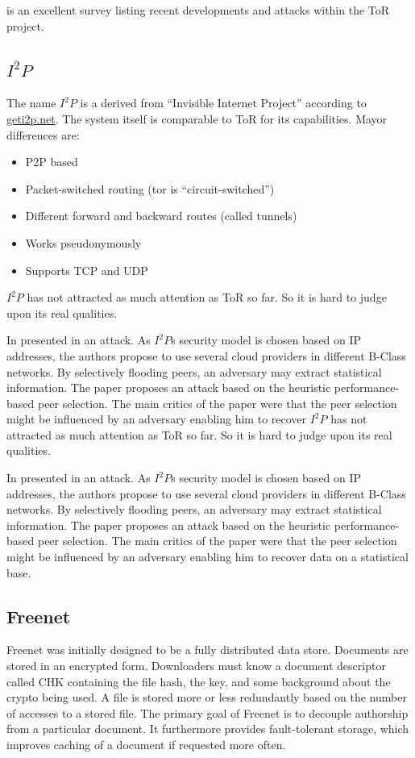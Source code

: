 \cite{saleh2018shedding} is an excellent survey listing recent developments and attacks within the ToR project.

\subsection{\texorpdfstring{$I^2P$}{I2P}}
The name $I^2P$ is a derived from  ``Invisible Internet Project'' according to \href{https://geti2p.net/}{geti2p.net}. The system itself is comparable to ToR for its capabilities. Mayor differences are:
\begin{itemize}
	\item P2P based
	\item Packet-switched routing (tor is ``circuit-switched'')
	\item Different forward and backward routes (called tunnels)
	\item Works pseudonymously
	\item Supports TCP and UDP
\end{itemize}

$I^2P$ has not attracted as much attention as ToR so far. So it is hard to judge upon its real qualities.

In \citeyear{pets2011-i2p} \citeauthor{pets2011-i2p} presented in \cite{pets2011-i2p} an attack. As $I^2P$s security model is chosen based on IP addresses, the authors propose to use several cloud providers in different B-Class networks. By selectively flooding peers, an adversary may extract statistical information. The paper proposes an attack based on the heuristic performance-based peer selection. The main critics of the paper were that the peer selection might be influenced by an adversary enabling him to recover $I^2P$ has not attracted as much attention as ToR so far. So it is hard to judge upon its real qualities.

In \citeyear{pets2011-i2p} \citeauthor{pets2011-i2p} presented in \cite{pets2011-i2p} an attack. As $I^2P$s security model is chosen based on IP addresses, the authors propose to use several cloud providers in different B-Class networks. By selectively flooding peers, an adversary may extract statistical information. The paper proposes an attack based on the heuristic performance-based peer selection. The main critics of the paper were that the peer selection might be influenced by an adversary enabling him to recover data on a statistical base.


\subsection{Freenet}
Freenet was initially designed to be a fully distributed data store\cite{freenet}. Documents are stored in an encrypted form. Downloaders must know a document descriptor called CHK containing the file hash, the key, and some background about the crypto being used. A file is stored more or less redundantly based on the number of accesses to a stored file. The primary goal of Freenet is to decouple authorship from a particular document. It furthermore provides fault-tolerant storage, which improves caching of a document if requested more often.

